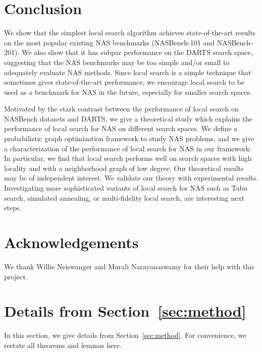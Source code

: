 \documentclass[11pt]{article}
\numberwithin{equation}{section}
\numberwithin{figure}{section}
\theoremstyle{plain}
\theoremstyle{definition}
\begin{document}
 
\section{Conclusion} \label{sec:conclusion}
We show that the simplest local search algorithm  achieves state-of-the-art results on 
the most popular existing NAS benchmarks (NASBench-101 and NASBench-201).
We also show that it has subpar performance on the DARTS search space,
suggesting that the NAS benchmarks may be too simple and/or small to adequately evaluate NAS methods.
Since local search is a simple technique that sometimes gives state-of-the-art performance,
we encourage local search to be used as a benchmark for NAS in the future,
especially for smaller search spaces.

Motivated by the stark contrast between the performance of local search on NASBench datasets
and DARTS, we give a theoretical study which explains the performance of local search for
NAS on different search spaces.
We define a probabilistic graph optimization framework to study NAS problems, and
we give a characterization of the performance of local search for NAS in our framework. 
In particular, we find that local search performs well on search spaces with high locality
and with a neighborhood graph of low degree.
Our theoretical results may be of independent interest.
We validate our theory with experimental results.
Investigating more sophisticated variants of local search for NAS such as 
Tabu search, simulated annealing,
or multi-fidelity local search, are interesting next steps.



 
\section*{Acknowledgements}
We thank Willie Neiswanger and Murali Narayanaswamy for their help with this project.

\newpage




\newpage
\appendix

\section{Details from Section~\ref{sec:method}} \label{app:method}

In this section, we give details from Section~\ref{sec:method}.
For convenience, we restate all theorems and lemmas here.
\end{document}
